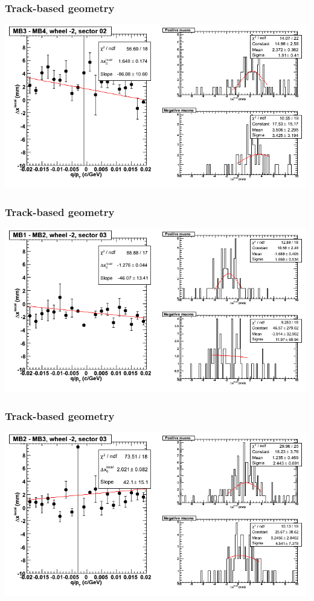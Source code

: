 \documentclass[compress]{beamer}
\begin{document}
\begin{frame}
\frametitle{Track-based geometry}
\includegraphics[width=\linewidth]{NOV4_segdiffs/dt13_resid_A_02_34.png}
\end{frame}

\begin{frame}
\frametitle{Track-based geometry}
\includegraphics[width=\linewidth]{NOV4_segdiffs/dt13_resid_A_03_12.png}
\end{frame}

\begin{frame}
\frametitle{Track-based geometry}
\includegraphics[width=\linewidth]{NOV4_segdiffs/dt13_resid_A_03_23.png}
\end{frame}
\end{document}
